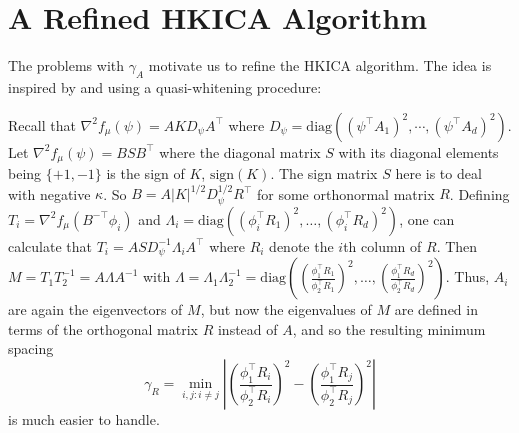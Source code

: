 \documentclass[jmlr]{article}
\theoremstyle{definition}
\begin{document}
\section{A Refined HKICA Algorithm}
\label{sec:DICA}

The problems with $\gamma_A$ motivate us to refine the HKICA algorithm.
The idea is inspired by \citet{arora2012provable} and \citet{frieze1996learning} using a quasi-whitening procedure:

Recall that  $\nabla^2 f_{\mu}(\psi)=A K D_{\psi} A^\top$ where $D_{\psi}=\text{diag}\left((\psi^{\top}A_1)^2,\cdots, (\psi^{\top}A_d)^2\right)$.
 Let $\nabla^2 f_\mu(\psi) = BSB^{\top}$ where the diagonal matrix $S$ with its diagonal elements being $\{+1, -1\}$ is the sign of $K$, $\text{sign}(K)$. The sign matrix $S$ here is to deal with negative $\kappa$.
So $B=A|K|^{1/2}D_{\psi}^{1/2}R^{\top}$ for some orthonormal matrix $R$. Defining $T_i=\nabla^2 f_\mu(B^{-\top} \phi_i)$ and $\Lambda_i=\text{diag}\left((\phi_i^\top R_1)^2,\ldots,(\phi_i^\top R_d)^2 \right) $, one can calculate that
$T_i=A S D_\psi^{-1} \Lambda_i A^\top$ 
where $R_i$ denote the $i$th column of $R$.
Then $M=T_1 T_2^{-1} = A\Lambda A^{-1}$ with $\Lambda=\Lambda_1 \Lambda_2^{-1}=\text{diag}\left(\left(\frac{\phi_1^\top R_1}{\phi_2^\top R_1}\right)^2,\ldots,\left(\frac{\phi_1^\top R_d}{\phi_2^\top R_d}\right)^2\right)$. Thus, $A_i$ are again the eigenvectors of $M$, but now the eigenvalues of $M$ are defined in terms of the orthogonal matrix $R$ instead of $A$,
and so the resulting minimum spacing
\begin{equation}
\label{def:gammaR}
\gamma_R =  \min_{i,j: i\neq j} \left\vert \left(\frac{\phi_1^{\top}R_i}{\phi_2^{\top}R_i}\right)^2 - \left(\frac{\phi_1^{\top}R_j}{\phi_2^{\top}R_j}\right)^2 \right\vert
\end{equation}
is much easier to handle.
\end{document}
